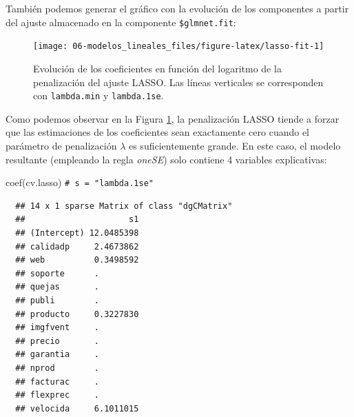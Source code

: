 \documentclass[
]{book}
\newenvironment{Shaded}{\begin{snugshade}}{\end{snugshade}}
\newcommand{\AttributeTok}[1]{\textcolor[rgb]{0.77,0.63,0.00}{#1}}
\newcommand{\CommentTok}[1]{\textcolor[rgb]{0.56,0.35,0.01}{\textit{#1}}}
\newcommand{\ConstantTok}[1]{\textcolor[rgb]{0.00,0.00,0.00}{#1}}
\newcommand{\DecValTok}[1]{\textcolor[rgb]{0.00,0.00,0.81}{#1}}
\newcommand{\FloatTok}[1]{\textcolor[rgb]{0.00,0.00,0.81}{#1}}
\newcommand{\FunctionTok}[1]{\textcolor[rgb]{0.00,0.00,0.00}{#1}}
\newcommand{\NormalTok}[1]{#1}
\newcommand{\SpecialCharTok}[1]{\textcolor[rgb]{0.00,0.00,0.00}{#1}}
\newcommand{\StringTok}[1]{\textcolor[rgb]{0.31,0.60,0.02}{#1}}
\theoremstyle{break}
\theoremstyle{nonumberplain}
\renewcommand{\CommentTok}[1]{\textcolor[rgb]{0.41,0.41,0.41}{\texttt{#1}}}
\begin{document}
También podemos generar el gráfico con la evolución de los componentes a partir del ajuste almacenado en la componente \texttt{\$glmnet.fit}:



\begin{Shaded}
\end{Shaded}

\begin{figure}[!htb]

{\centering \texttt{[image: 06-modelos\_lineales\_files/figure-latex/lasso-fit-1]} 

}

\caption{Evolución de los coeficientes en función del logaritmo de la penalización del ajuste LASSO. Las líneas verticales se corresponden con \texttt{lambda.min} y \texttt{lambda.1se}.}\label{fig:lasso-fit}
\end{figure}

Como podemos observar en la Figura \ref{fig:lasso-fit}, la penalización LASSO tiende a forzar que las estimaciones de los coeficientes sean exactamente cero cuando el parámetro de penalización \(\lambda\) es suficientemente grande.
En este caso, el modelo resultante (empleando la regla \emph{oneSE}) solo contiene 4 variables explicativas:

\begin{Shaded}
\begin{Highlighting}[]
\FunctionTok{coef}\NormalTok{(cv.lasso) }\CommentTok{\# s = "lambda.1se"}
\end{Highlighting}
\end{Shaded}

\begin{verbatim}
  ## 14 x 1 sparse Matrix of class "dgCMatrix"
  ##                     s1
  ## (Intercept) 12.0485398
  ## calidadp     2.4673862
  ## web          0.3498592
  ## soporte      .        
  ## quejas       .        
  ## publi        .        
  ## producto     0.3227830
  ## imgfvent     .        
  ## precio       .        
  ## garantia     .        
  ## nprod        .        
  ## facturac     .        
  ## flexprec     .        
  ## velocida     6.1011015
\end{verbatim}
\end{document}
